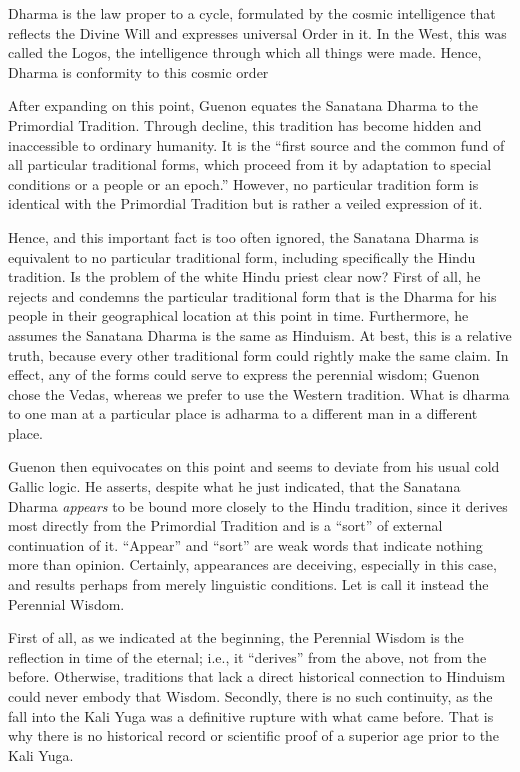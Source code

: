 Dharma is the law proper to a cycle, formulated by the cosmic intelligence that reflects the Divine Will and expresses universal Order in it. In the West, this was called the Logos, the intelligence through which all things were made. Hence, Dharma is conformity to this cosmic order

After expanding on this point, Guenon equates the Sanatana Dharma to the Primordial Tradition. Through decline, this tradition has become hidden and inaccessible to ordinary humanity. It is the ``first source and the common fund of all particular traditional forms, which proceed from it by adaptation to special conditions or a people or an epoch.'' However, no particular tradition form is identical with the Primordial Tradition but is rather a veiled expression of it.

Hence, and this important fact is too often ignored, the Sanatana Dharma is equivalent to no particular traditional form, including specifically the Hindu tradition. Is the problem of the white Hindu priest clear now? First of all, he rejects and condemns the particular traditional form that is the Dharma for his people in their geographical location at this point in time. Furthermore, he assumes the Sanatana Dharma is the same as Hinduism. At best, this is a relative truth, because every other traditional form could rightly make the same claim. In effect, any of the forms could serve to express the perennial wisdom; Guenon chose the Vedas, whereas we prefer to use the Western tradition. What is dharma to one man at a particular place is adharma to a different man in a different place.

Guenon then equivocates on this point and seems to deviate from his usual cold Gallic logic. He asserts, despite what he just indicated, that the Sanatana Dharma \emph{appears} to be bound more closely to the Hindu tradition, since it derives most directly from the Primordial Tradition and is a ``sort'' of external continuation of it. ``Appear'' and ``sort'' are weak words that indicate nothing more than opinion. Certainly, appearances are deceiving, especially in this case, and results perhaps from merely linguistic conditions. Let is call it instead the Perennial Wisdom.

First of all, as we indicated at the beginning, the Perennial Wisdom is the reflection in time of the eternal; i.e., it ``derives'' from the above, not from the before. Otherwise, traditions that lack a direct historical connection to Hinduism could never embody that Wisdom. Secondly, there is no such continuity, as the fall into the Kali Yuga was a definitive rupture with what came before. That is why there is no historical record or scientific proof of a superior age prior to the Kali Yuga.


